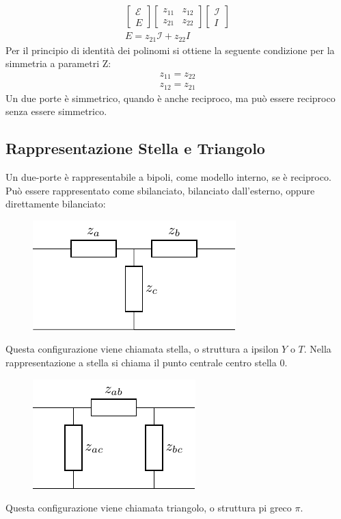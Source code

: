 \documentclass{article}
\numberwithin{equation}{subsection}
\begin{document}
\begin{gather*}
    \begin{bmatrix}
        \mathcal{E}\\E
    \end{bmatrix}\begin{bmatrix}
        z_{11}&z_{12}\\z_{21}&z_{22}
    \end{bmatrix}\begin{bmatrix}
        \mathcal{I}\\I
    \end{bmatrix}\\
    E=z_{21}\mathcal{I}+z_{22}I
\end{gather*}
Per il principio di identità dei polinomi si ottiene la seguente condizione per la simmetria a parametri Z:
\begin{gather*}
    z_{11}=z_{22}\\
    z_{12}=z_{21}
\end{gather*}
Un due porte è simmetrico, quando è anche reciproco, ma può essere reciproco senza essere simmetrico. 

\subsection{Rappresentazione Stella e Triangolo}

Un due-porte è rappresentabile a bipoli, come modello interno, se è reciproco. Può essere rappresentato come sbilanciato, bilanciato dall'esterno, oppure direttamente 
bilanciato:
\begin{figure}[H]%
    \centering
    \includegraphics{rappresentazione-stella.pdf}%
    \label{fig:rappresentazione-stella}
\end{figure}
Questa configurazione viene chiamata stella, o struttura a ipsilon $Y$ o $T$.  
Nella rappresentazione a stella si chiama il punto centrale centro stella $0$. 
\begin{figure}[H]%
    \centering
    \includegraphics{rappresentazione-triangolo.pdf}%
    \label{fig:rappresentazione-triangolo}
\end{figure}
Questa configurazione viene chiamata triangolo, o struttura pi greco $\pi$.  
\end{document}
